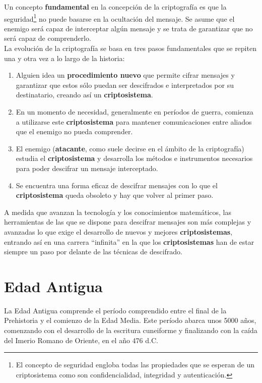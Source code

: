 \documentclass[nochap]{apuntesURJC}
\begin{document}
Un concepto \textbf{fundamental} en la concepción de la criptografía es que la seguridad\footnote{El concepto de seguridad engloba todas las propiedades que se esperan de un criptosistema como son confidencialidad, integridad y autenticación.} no puede basarse en la ocultación del mensaje. Se asume que el enemigo será capaz de interceptar algún mensaje y se trata de garantizar que no será capaz de comprenderlo.\\

La evolución de la criptografía se basa en tres pasos fundamentales que se repiten una y otra vez a lo largo de la historia:
\begin{enumerate}
\item Alguien idea un \textbf{procedimiento nuevo} que permite cifrar mensajes y garantizar que estos sólo puedan ser descifrados e interpretados por su destinatario, creando así un \textbf{criptosistema}.

\item En un momento de necesidad, generalmente en períodos de guerra, comienza a utilizarse este \textbf{criptosistema} para mantener comunicaciones entre aliados que el enemigo no pueda comprender.

\item El enemigo (\textbf{atacante}, como suele decirse en el ámbito de la criptografía) estudia el \textbf{criptosistema} y desarrolla los métodos e instrumentos necesarios para poder descifrar un mensaje interceptado.

\item Se encuentra una forma eficaz de descifrar mensajes con lo que el \textbf{criptosistema} queda obsoleto y hay que volver al primer paso.
\end{enumerate}

A medida que avanzan la tecnología y los conocimientos matemáticos, las herramientas de las que se dispone para descifrar mensajes son más complejas y avanzadas lo que exige el desarrollo de nuevos y mejores \textbf{criptosistemas}, entrando así en una carrera ``infinita'' en la que los \textbf{criptosistemas} han de estar siempre un paso por delante de las técnicas de descifrado.\\

\section{Edad Antigua}

La Edad Antigua comprende el período comprendido entre el final de la Prehistoria y el comienzo de la Edad Media. Este período abarca unos 5000 años, comenzando con el desarrollo de la escritura cuneiforme y finalizando con la caída del Imerio Romano de Oriente, en el año 476 d.C.
\end{document}
